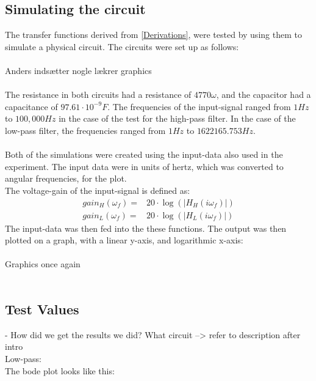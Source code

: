 \subsection{Simulating the circuit}
The transfer functions derived from \cref{Derivations}, were tested by using them to simulate a physical circuit. The circuits were set up as follows:
\\
\\
Anders indsætter nogle lækrer graphics
\\
\\
The resistance in both circuits had a resistance of $4770 \omega$, and the capacitor had a capacitance of $97.61\cdot 10^{-9} F$. The frequencies of the input-signal ranged from $1 Hz$ to $100,000 Hz$ in the case of the test for the high-pass filter. In the case of the low-pass filter, the frequencies ranged from $1 Hz$ to $1622165.753 Hz$.
\\
\\
Both of the simulations were created using the input-data also used in the experiment. The input data were in units of hertz, which was converted to angular frequencies, for the plot.
\\
The voltage-gain of the input-signal is defined as:
\begin{align*}
	gain_H(\omega _f) =&20 \cdot \log{\left( \left|H_{H}(i \omega_f)\right| \right)}
	\\
	gain_L(\omega _f) =&20 \cdot \log{\left( \left|H_{L}(i \omega_f)\right| \right)}
\end{align*}
The input-data was then fed into the these functions. The output was then plotted on a graph, with a linear y-axis, and logarithmic x-axis:
\\
\\
Graphics once again
\\
\\


\subsection{Test Values}
- How did we get the results we did? What circuit --> refer to description after intro \\
Low-pass: \\
The bode plot looks like this:

